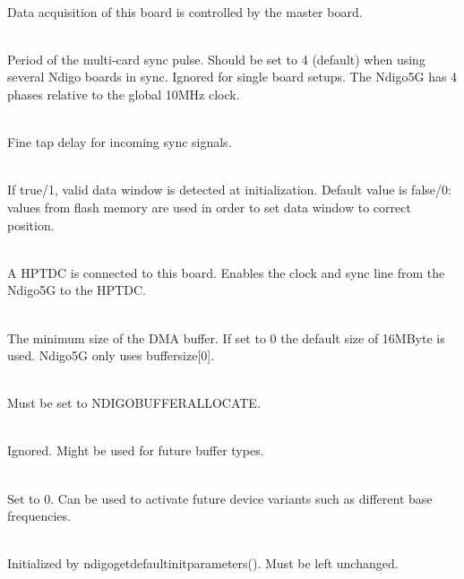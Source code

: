             \\
            Data acquisition of this board is controlled by the master board.\par

            \\
            Period of the multi-card sync pulse. Should be set to 4 (default) when using several Ndigo boards in sync. Ignored for single board setups. The Ndigo5G has 4 phases relative to the global 10MHz clock.\par

            \\
            Fine tap delay for incoming sync signals.\par

            \\
            If true/1, valid data window is detected at initialization. Default value is false/0: values from flash memory are used in order to set data window to correct position.

            \\
            A HPTDC is connected to this board. Enables the clock and sync line from the Ndigo5G to the HPTDC.\par

            \\
            The minimum size of the DMA buffer. If set to 0 the default size of 16MByte is used. Ndigo5G only uses \textsf{buffer\tu size[0]}.\par

            \\
            Must be set to \textsf{NDIGO\tu BUFFER\tu ALLOCATE}.\par

            \\
            Ignored. Might be used for future buffer types.\par

            \\
            Set to 0. Can be used to activate future device variants such as different base frequencies.\par

            \\
            Initialized by \textsf{ndigo\tu get\tu default\tu init\tu parameters()}. Must be left unchanged.

